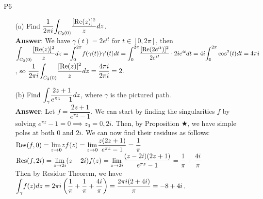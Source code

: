 \documentclass{article}
\begin{document}
\newpage
\begin{itemize}
      \item [P6]
            \begin{itemize}
                  \item [(a)] Find $\dfrac{1}{2\pi i}\mathlarger{\int_{C_2(0)}}\dfrac{[\Re(z)]^2}{z}dz$.\\
                        \textbf{Answer}: We have $\gamma(t)=2e^{it}$ for $t\in[0,2\pi]$, then $\mathlarger{\int_{C_2(0)}}\dfrac{[\Re(z)]^2}{z}dz=\mathlarger{\int_0^{2\pi}}f(\gamma(t))\gamma'(t)dt=\mathlarger{\int_0^{2\pi}}\dfrac{[\Re(2e^{it})]^2}{2e^{it}}\cdot 2ie^{it}dt=4i\mathlarger{\int_0^{2\pi}}\cos^2(t)dt=4\pi i$, so $\dfrac{1}{2\pi i}\mathlarger{\int_{C_2(0)}}\dfrac{[\Re(z)]^2}{z}dz=\dfrac{4\pi i}{2\pi i}=2$.
                  \item [(b)] Find $\mathlarger{\int_\gamma}\dfrac{2z+1}{e^{\pi z}-1}dz$, where $\gamma$ is the pictured path.\\
                        \textbf{Answer}: Let $f=\dfrac{2z+1}{e^{\pi z}-1}$. We can start by finding the singularities $f$ by solving $e^{\pi z}-1=0\implies z_0=0,2i$. Then, by Proposition $\bigstar$, we have simple poles at both $0$ and $2i$. We can now find their residues as follows:\\
                        $\Res(f,0)=\mathlarger{\lim_{z\rightarrow 0}}zf(z)=\mathlarger{\lim_{z\rightarrow 0}}\dfrac{z(2z+1)}{e^{\pi z}-1}=\dfrac{1}{\pi}$\\
                        $\Res(f,2i)=\mathlarger{\lim_{z\rightarrow 2i}}(z-2i)f(z)=\mathlarger{\lim_{z\rightarrow 2i}}\dfrac{(z-2i)(2z+1)}{e^{\pi z}-1}=\dfrac{1}{\pi}+\dfrac{4i}{\pi}$\\
                        Then by Residue Theorem, we have\\
                        $\mathlarger{\int_\gamma}f(z)dz=2\pi i\left(\dfrac{1}{\pi}+\dfrac{1}{\pi}+\dfrac{4i}{\pi}\right)=\dfrac{2\pi i(2+4i)}{\pi}=-8+4i$.
            \end{itemize}
\end{itemize}
\end{document}
